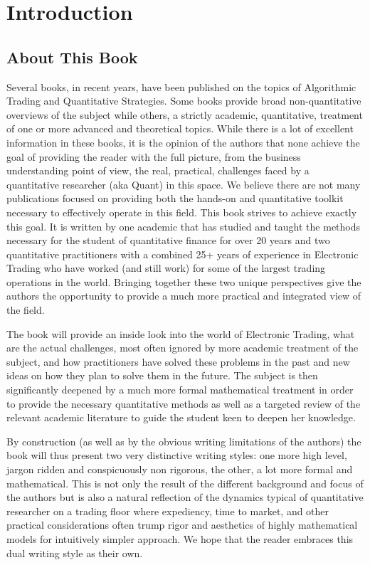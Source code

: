 \chapter{Introduction}\label{chap:ch_intro}
\section{About This Book}

Several books, in recent years, have been published  on the topics of Algorithmic Trading and Quantitative Strategies. Some books provide broad non-quantitative overviews of the subject while others, a strictly academic, quantitative, treatment of one or more advanced and theoretical topics. While there is a lot of excellent information in these books, it is the opinion of the authors that none achieve the goal of providing the reader with the full picture, from the business understanding point of view, the real, practical, challenges faced by a quantitative researcher (aka Quant) in this space. We believe there are not many publications focused on providing both the hands-on and quantitative toolkit necessary to effectively operate in this field. This book strives to achieve exactly this goal. It is written by one academic that has studied and taught the methods necessary for the student of quantitative finance for over 20 years and two quantitative practitioners with a combined 25+ years of experience in Electronic Trading who have worked (and still work) for some of the largest trading operations in the world. Bringing together these two unique perspectives give the authors the opportunity to provide a much more practical and integrated view of the field.


The book will provide an inside look into the world of Electronic Trading, what are the actual challenges, most often ignored by more academic treatment of the subject, and how practitioners have solved these problems in the past and new ideas on how they plan to solve them in the future. The subject is then significantly deepened by a much more formal mathematical treatment in order to provide the necessary quantitative methods as well as a targeted review of the relevant academic literature to guide the student keen to deepen her knowledge.


By construction (as well as by the obvious writing limitations of the authors) the book will thus present two very distinctive writing styles: one more high level, jargon ridden and conspicuously non rigorous, the other, a lot more formal and mathematical. This is not only the result of the different background and focus of the authors but is also a natural reflection of the dynamics typical of quantitative researcher on a trading floor where expediency, time to market, and other practical considerations often trump rigor and aesthetics of highly mathematical models for intuitively simpler approach. We hope that the reader embraces this dual writing style as their own.


